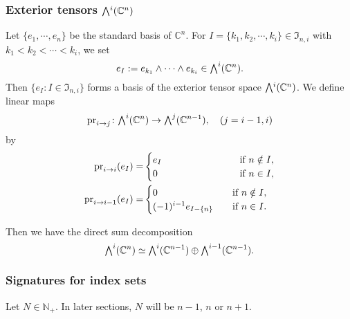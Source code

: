 \subsubsection{Exterior tensors $\Exterior^i({\mathbb{C}}^n)$}
Let $\{e_1, \cdots, e_n\}$ be the standard basis of ${\mathbb{C}}^n$.  
For $I = \{k_1,k_2,\cdots, k_i\}\in {\mathfrak{I}}_{n,i}$
 with $k_1 < k_2 < \cdots < k_i$,
 we set
\[
   e_I := e_{k_1} \wedge \cdots \wedge e_{k_i} \in {\Exterior}^i({\mathbb{C}}^n).  
\]
Then $\{e_I:I\in {\mathfrak{I}}_{n,i}\}$ forms
 a basis of the exterior tensor space $\Exterior^i({\mathbb{C}}^n)$.  
We define linear maps
\[
\pr i j \colon {\Exterior}^i({\mathbb{C}}^n) \to {\Exterior}^j({\mathbb{C}}^{n-1}), 
\quad
(j=i-1,i)
\]
by 
\begin{align}
\label{eqn:Tii1}
\pr i i (e_I)=&
\begin{cases}
e_I \hspace{25mm} &\text{if}\ n \notin I, 
\\
0 \qquad &\text{if}\ n \in I, 
\end{cases}
\\
\label{eqn:Tii2}
\pr i {i-1} (e_I)=&
\begin{cases}
0  &\text{if}\ n \notin I, 
\\
(-1)^{i-1} e_{I \setminus \{n\}} \quad &\text{if}\ n \in I.  
\end{cases}
\end{align}

Then we have the direct sum decomposition 
\begin{equation}
\label{eqn:extij}
  {\Exterior}^i({\mathbb{C}}^n) \simeq {\Exterior}^i({\mathbb{C}}^{n-1})
                                     \oplus
                                     {\Exterior}^{i-1}({\mathbb{C}}^{n-1}).  
\end{equation}
\subsubsection{Signatures for index sets}
Let $N \in {\mathbb{N}}_+$.  
In later sections, 
 $N$ will be $n-1$, $n$ or $n+1$.  

